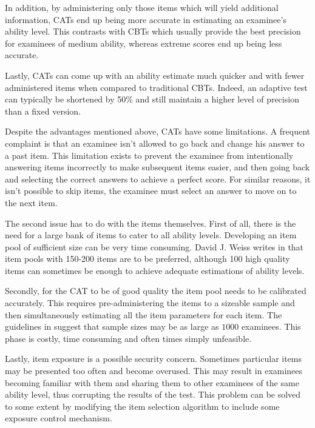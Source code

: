 In addition, by administering only those items which will yield additional information, CATs end up being more accurate in estimating an examinee's ability level. This contrasts with CBTs which usually provide the best precision for examinees of medium ability, whereas extreme scores end up being less accurate.\newline

Lastly, CATs can come up with an ability estimate much quicker and with fewer administered items when compared to traditional CBTs. Indeed, an adaptive test can typically be shortened by 50\% and still maintain a higher level of precision than a fixed version.\cite{Weiss1984}
\newline

Despite the advantages mentioned above, CATs have some limitations. A frequent complaint is that an examinee isn't allowed to go back and change his answer to a past item. This limitation exists to prevent the examinee from intentionally answering items incorrectly to make subsequent items easier, and then going back and selecting the correct answers to achieve a perfect score. For similar reasons, it isn't possible to skip items, the examinee must select an answer to move on to the next item.\newline

The second issue has to do with the items themselves. First of all, there is the need for a large bank of items to cater to all ability levels. Developing an item pool of sufficient size can be very time consuming. David J. Weiss writes in \cite{Weiss1985} that item pools with 150-200 items are to be preferred, although 100 high quality items can sometimes be enough to achieve adequate estimations of ability levels.

Secondly, for the CAT to be of good quality the item pool needs to be calibrated accurately. This requires pre-administering the items to a sizeable sample and then simultaneously estimating all the item parameters for each item. The guidelines in \cite{CAT-Primer} suggest that sample sizes may be as large as $1000$ examinees. This phase is costly, time consuming and often times simply unfeasible.\newline

Lastly, item exposure is a possible security concern. Sometimes particular items may be presented too often and become overused. This may result in examinees becoming familiar with them and sharing them to other examinees of the same ability level, thus corrupting the results of the test. This problem can be solved to some extent by modifying the item selection algorithm to include some exposure control mechanism.\newline

